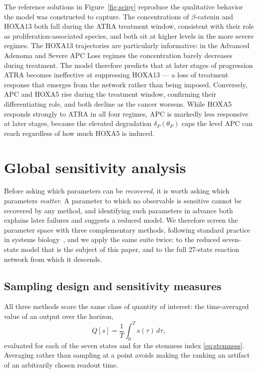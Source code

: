 \documentclass[11pt]{article}
\newcommand{\bcat}{$\beta$-\hspace{0pt}catenin}
\newcommand{\thP}{\theta_P}
\begin{document}
The reference solutions in Figure~\ref{fig:scipy} reproduce the qualitative
behavior the model was constructed to capture. The concentrations of \bcat{}
and HOXA13 both fall during the ATRA treatment window, consistent with their
role as proliferation-associated species, and both sit at higher levels in the
more severe regimes. The HOXA13 trajectories are particularly informative: in
the Advanced Adenoma and Severe APC Loss regimes the concentration barely
decreases during treatment. The model therefore predicts that at later stages
of progression ATRA becomes ineffective at suppressing HOXA13 --- a loss of
treatment response that emerges from the network rather than being imposed.
Conversely, APC and HOXA5 rise during the treatment window, confirming their
differentiating role, and both decline as the cancer worsens. While HOXA5
responds strongly to ATRA in all four regimes, APC is markedly less responsive
at later stages, because the elevated degradation $\delta_P(\thP)$ caps the
level APC can reach regardless of how much HOXA5 is induced.

\section{Global sensitivity analysis}
\label{sec:sa}

Before asking which parameters can be \emph{recovered}, it is worth asking
which parameters \emph{matter}. A parameter to which no observable is sensitive
cannot be recovered by any method, and identifying such parameters in advance
both explains later failures and suggests a reduced model. We therefore screen
the parameter space with three complementary methods, following standard
practice in systems biology~\citep{saltelli2010variance}, and we apply the same
suite twice: to the reduced seven-state model that is the subject of this paper,
and to the full 27-state reaction network from which it descends.

\subsection{Sampling design and sensitivity measures}

All three methods score the same class of quantity of interest: the
time-averaged value of an output over the horizon,
\begin{equation}
Q[s] = \frac{1}{T}\int_0^T s(\tau)\,d\tau,
\end{equation}
evaluated for each of the seven states and for the stemness index
\eqref{eq:stemness}. Averaging rather than sampling at a point avoids making
the ranking an artifact of an arbitrarily chosen readout time.
\end{document}
